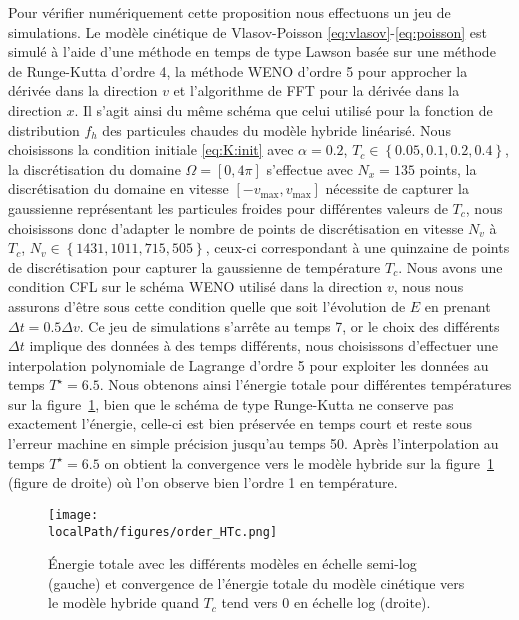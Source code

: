 Pour vérifier numériquement cette proposition nous effectuons un jeu de simulations. Le modèle cinétique de Vlasov-Poisson \eqref{eq:vlasov}-\eqref{eq:poisson} est simulé à l'aide d'une méthode en temps de type Lawson basée sur une méthode de Runge-Kutta d'ordre 4, la méthode WENO d'ordre 5 pour approcher la dérivée dans la direction $v$ et l'algorithme de FFT pour la dérivée dans la direction $x$. Il s'agit ainsi du même schéma que celui utilisé pour la fonction de distribution $f_h$ des particules chaudes du modèle hybride linéarisé. Nous choisissons la condition initiale \eqref{eq:K:init} avec $\alpha = 0.2$, $T_c \in \left\{ 0.05,0.1,0.2,0.4\right\}$, la discrétisation du domaine $\Omega = [0,4\pi]$ s'effectue avec $N_x = 135$ points, la discrétisation du domaine en vitesse $[-v_{\text{max}},v_{\text{max}}]$ nécessite de capturer la gaussienne représentant les particules froides pour différentes valeurs de $T_c$, nous choisissons donc d'adapter le nombre de points de discrétisation en vitesse $N_v$ à $T_c$, $N_v \in \left\{ 1431,1011,715,505 \right\}$, ceux-ci correspondant à une quinzaine de points de discrétisation pour capturer la gaussienne de température $T_c$. Nous avons une condition CFL sur le schéma WENO utilisé dans la direction $v$, nous nous assurons d'être sous cette condition quelle que soit l'évolution de $E$ en prenant $\Delta t = 0.5\Delta v$. Ce jeu de simulations s'arrête au temps 7, or le choix des différents $\Delta t$ implique des données à des temps différents, nous choisissons d'effectuer une interpolation polynomiale de Lagrange d'ordre 5 pour exploiter les données au temps $T^\star = 6.5$. Nous obtenons ainsi l'énergie totale pour différentes températures sur la figure~\ref{fig:limit:totalenergy}, bien que le schéma de type Runge-Kutta ne conserve pas exactement l'énergie, celle-ci est bien préservée en temps court et reste sous l'erreur machine en simple précision jusqu'au temps 50. Après l'interpolation au temps $T^\star = 6.5$ on obtient la convergence vers le modèle hybride sur la figure~\ref{fig:limit:totalenergy} (figure de droite) où l'on observe bien l'ordre 1 en température.
\begin{figure}[h]
  \centering
  \texttt{[image: \\localPath/figures/order\_HTc.png]}
  \caption{Énergie totale avec les différents modèles en échelle semi-log (gauche) et convergence de l'énergie totale du modèle cinétique vers le modèle hybride quand $T_c$ tend vers $0$ en échelle log (droite).}
  \label{fig:limit:totalenergy}
\end{figure}

